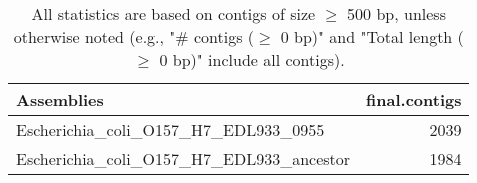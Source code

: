 \documentclass[12pt,a4paper]{article}
\begin{document}
\begin{table}[ht]
\begin{center}
\caption{All statistics are based on contigs of size $\geq$ 500 bp, unless otherwise noted (e.g., "\# contigs ($\geq$ 0 bp)" and "Total length ($\geq$ 0 bp)" include all contigs).}
\begin{tabular}{|l*{1}{|r}|}
\hline
Assemblies & final.contigs \\ \hline
Escherichia\_coli\_O157\_H7\_EDL933\_0955 & 2039 \\ \hline
Escherichia\_coli\_O157\_H7\_EDL933\_ancestor & 1984 \\ \hline
\end{tabular}
\end{center}
\end{table}
\end{document}
